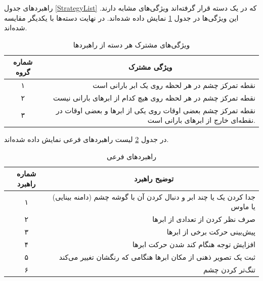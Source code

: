 \documentclass[twoside, a4paper,11pt]{book}
\numberwithin{equation}{chapter}
\numberwithin{table}{chapter}
\numberwithin{figure}{chapter}
\numberwithin{equation}{chapter}
\begin{document}
راهبرد‌های جدول \ref{StrategyList} که در یک دسته قرار گرفته‌اند ویژگی‌های مشابه دارند. این ویژگی‌ها در جدول \ref{mainStrategyGroups} نمایش داده شده‌اند. در نهایت دسته‌ها با یکدیگر مقایسه شده‌اند.

\begin{table}[]
\centering
\caption{ویژگی‌های مشترک هر دسته از راهبرد‌ها}
\label{mainStrategyGroups}
\begin{scriptsize}
\begin{center}
\renewcommand{\arraystretch}{2}
\begin{tabular}{|c|r|}
\hline
\textbf{شماره گروه} & \multicolumn{1}{c|}{\textbf{ویژگی مشترک}} \\ \hline
۱ & نقطه تمرکز چشم در هر لحظه روی یک ابر بارانی است \\ \hline
۲ & نقطه تمرکز چشم در هر لحظه روی هیچ کدام از ابرهای بارانی نیست \\ \hline
۳ & نقطه تمرکز چشم بعضی اوقات روی یکی از ابرها و بعضی اوقات در نقطه‌ای خارج از ابرهای بارانی است. \\ \hline
\end{tabular}
\end{center}
\end{scriptsize}
\end{table}
در جدول \ref{secondaryStrategies} لیست راهبرد‌های فرعی نمایش داده شده‌اند.

\begin{table}[]
\centering
\caption{راهبرد‌های فرعی}
\label{secondaryStrategies}
\begin{scriptsize}
\begin{center}
\renewcommand{\arraystretch}{2}
\begin{tabular}{|c|r|}
\hline
\textbf{شماره راهبرد} & \multicolumn{1}{c|}{\textbf{توضیح راهبرد}} \\ \hline
۱ & جدا کردن یک یا چند ابر و دنبال کردن آن با گوشه چشم (دامنه بینایی) یا ماوس \\ \hline
۲ & صرف نظر کردن از تعدادی از ابرها \\ \hline
۳ & پیش‌بینی حرکت برخی از ابرها \\ \hline
۴ & افزایش توجه هنگام کند شدن حرکت ابرها \\ \hline
۵ & ثبت یک تصویر ذهنی از مکان ابرها هنگامی که رنگشان تغییر می‌کند \\ \hline
۶ & تنگ‌تر کردن چشم \\ \hline
\end{tabular}
\end{center}
\end{scriptsize}
\end{table}
\end{document}
